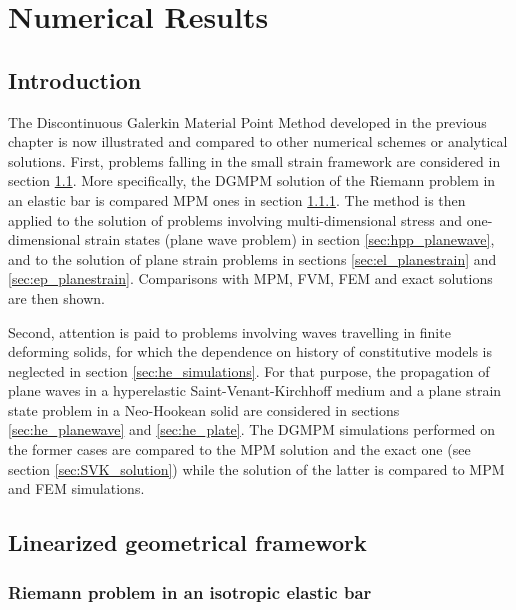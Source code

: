 \chapter{Numerical Results}
\section*{Introduction}
The Discontinuous Galerkin Material Point Method developed in the previous chapter is now illustrated and compared to other numerical schemes or analytical solutions. 
First, problems falling in the small strain framework are considered in section \ref{sec:hpp_simulations}. More specifically, the DGMPM solution of the Riemann problem in an elastic bar is compared MPM ones in section \ref{sec:hpp_bar}. The method is then applied to the solution of problems involving multi-dimensional stress and one-dimensional strain states (plane wave problem) in section \ref{sec:hpp_planewave}, and to the solution of plane strain problems in sections \ref{sec:el_planestrain} and \ref{sec:ep_planestrain}. Comparisons with MPM, FVM, FEM and exact solutions are then shown.

Second, attention is paid to problems involving waves travelling in finite deforming solids, for which the dependence on history of constitutive models is neglected in section \ref{sec:he_simulations}. For that purpose, the propagation of plane waves in a hyperelastic Saint-Venant-Kirchhoff medium and a plane strain state problem in a Neo-Hookean solid are considered in sections \ref{sec:he_planewave} and \ref{sec:he_plate}. The DGMPM simulations performed on the former cases are compared to the MPM solution and the exact one (see section \ref{sec:SVK_solution}) while the solution of the latter is compared to MPM and FEM simulations.


\section{Linearized geometrical framework}
\label{sec:hpp_simulations}

\subsection{Riemann problem in an isotropic elastic bar}
\label{sec:hpp_bar}


